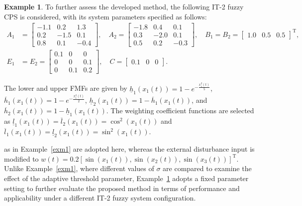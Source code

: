 \documentclass[preprint,review,fleqn,sort&compress,3p]{elsarticle}
\theoremstyle{definition} %
\theoremstyle{definition}%
\newtheorem{example}{Example}
\newif\ifreviewmarkup
\DeclareRobustCommand{\revdel}[1]{\ifreviewmarkup{\color{revisionred}\hypersetup{linkcolor=revisionred,citecolor=revisionred}#1}\fi}
\DeclareRobustCommand{\revadd}[1]{{\ifreviewmarkup\color{revisiongreen}\hypersetup{linkcolor=revisiongreen,citecolor=revisiongreen}\fi#1}}
\begin{document}
\begin{example}\label{exm2}
To further assess the developed method, the following IT-2 fuzzy CPS is considered, with its system parameters specified as follows:
\begin{align*}
	A_1 &= \begin{bmatrix}
		-1.1 & 0.2 & 1.3 \\
		0.2 & -1.5 & 0.1 \\
		0.8 & 0.1 & -0.4
	\end{bmatrix}, \quad
	A_2 = \begin{bmatrix}
		-1.8 & 0.4 & 0.1 \\
		0.3 & -2.0 & 0.1 \\
		0.5 & 0.2 & -0.3
	\end{bmatrix}, \quad
	B_1 = B_2 = \begin{bmatrix} 1.0 & 0.5 & 0.5 \end{bmatrix}^{\mathrm{T}}, \\
	E_1 &= E_2 =
	\begin{bmatrix}
		0.1 & 0 & 0 \\
		0 & 0 & 0.1 \\
		0 & 0.1 & 0.2
	\end{bmatrix}, \quad
	C = \begin{bmatrix} 0.1 & 0 & 0 \end{bmatrix}.
\end{align*}

The lower and upper FMFs are given by $\underline{h}_1(x_1(t)) = 1 - e^{-\frac{x_1^2(t)}{5}}$, $\overline{h}_1(x_1(t)) = 1 - e^{-\frac{x_1^2(t)}{2}}$, $\underline{h}_2(x_1(t)) = 1 - \overline{h}_1(x_1(t))$, and $\overline{h}_2(x_1(t)) = 1 - \underline{h}_1(x_1(t))$. The weighting coefficient functions are selected as $\underline{l}_1(x_1(t))=\overline{l}_2(x_1(t))=\cos^{2}(x_1(t))$ and $\overline{l}_1(x_1(t))=\underline{l}_2(x_1(t))=\sin^{2}(x_1(t))$. 

\label{rev:M47}\revdel{The same actuator-failure transition rate matrix, and deception attack signal} as in Example~\ref{exm1} are adopted here, whereas the external disturbance input is modified to $w(t) = 0.2[\sin(x_1(t)),\sin(x_2(t)),\sin(x_3(t))]^{\mathrm{T}}$. Unlike Example~\ref{exm1}, where different values of $\sigma$ are compared to examine the effect of the adaptive threshold parameter, Example~\ref{exm2} adopts a fixed parameter setting to further evaluate the proposed method in terms of performance and applicability under a different IT-2 fuzzy system configuration.


\end{example}
\end{document}

